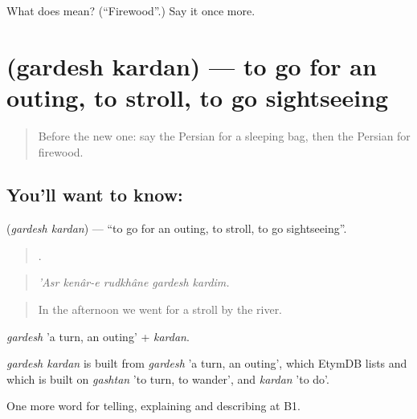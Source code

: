 \begin{tcolorbox}[breakable,colback=teal!4,colframe=teal!35!black,title={Before you move on}]
What does  mean? (\textquotedblleft{}Firewood\textquotedblright{}.) Say it once more.
\end{tcolorbox}
\section[\texorpdfstring{\fa{گردش} \fa{کردن} (gardesh kardan)}{گردش کردن (gardesh kardan)}]{  (gardesh kardan) — to go for an outing, to stroll, to go sightseeing}

\label{lesson:FA-C470-gardesh-kardan}



\begin{quote}
Before the new one: say the Persian for a sleeping bag, then the Persian for firewood.
\end{quote}

\subsection*{You'll want to know:  }
\textbf{ } (\emph{gardesh kardan}) — \textquotedblleft{}to go for an outing, to stroll, to go sightseeing\textquotedblright{}.

\begin{quote}
    .
\end{quote}

\begin{quote}
\emph{'Asr kenâr-e rudkhâne gardesh kardim.}
\end{quote}

\begin{quote}
In the afternoon we went for a stroll by the river.
\end{quote}

\emph{gardesh} 'a turn, an outing' + \emph{kardan}.

\begin{cousinweb}
\emph{gardesh kardan} is built from \emph{gardesh} 'a turn, an outing', which EtymDB lists and which is built on \emph{gashtan} 'to turn, to wander', and \emph{kardan} 'to do'.
\end{cousinweb}

\begin{grammarlens}[title={What you've built}]
One more word for telling, explaining and describing at B1.
\end{grammarlens}

